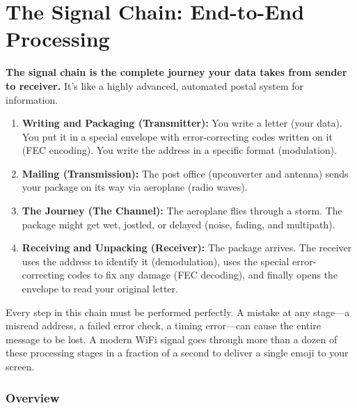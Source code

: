 
\chapter{The Signal Chain: End-to-End Processing}
\label{ch:signal-chain}

\begin{nontechnical}
    \textbf{The signal chain is the complete journey your data takes from sender to receiver.} It's like a highly advanced, automated postal system for information.

    \begin{enumerate}
        \item \textbf{Writing and Packaging (Transmitter):} You write a letter (your data). You put it in a special envelope with error-correcting codes written on it (FEC encoding). You write the address in a specific format (modulation).
        \item \textbf{Mailing (Transmission):} The post office (upconverter and antenna) sends your package on its way via aeroplane (radio waves).
        \item \textbf{The Journey (The Channel):} The aeroplane flies through a storm. The package might get wet, jostled, or delayed (noise, fading, and multipath).
        \item \textbf{Receiving and Unpacking (Receiver):} The package arrives. The receiver uses the address to identify it (demodulation), uses the special error-correcting codes to fix any damage (FEC decoding), and finally opens the envelope to read your original letter.
    \end{enumerate}
    
     Every step in this chain must be performed perfectly. A mistake at any stage—a misread address, a failed error check, a timing error—can cause the entire message to be lost. A modern WiFi signal goes through more than a dozen of these processing stages in a fraction of a second to deliver a single emoji to your screen.
\end{nontechnical}


\subsection{Overview}

